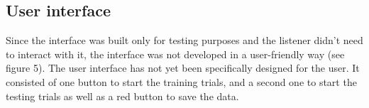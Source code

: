 \documentclass[journal]{IEEEtran}
\begin{document}


\subsection{User interface}
Since the interface was built only for testing purposes and the listener didn't need to interact with it, the interface was not developed in a user-friendly way (see figure 5). The user interface has not yet been specifically designed for the user. It consisted of one button to start the training trials, and a second one to start the testing trials as well as a red button to save the data. 
\end{document}
